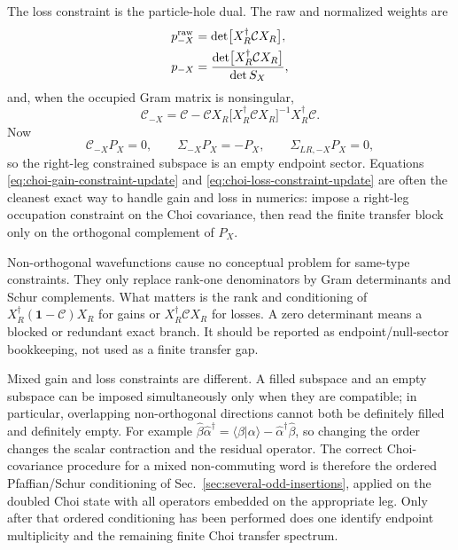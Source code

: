 \documentclass[aps,prb,onecolumn,nofootinbib,superscriptaddress]{revtex4-2}
\newcommand{\I}{\mathbf{1}}
\theoremstyle{plain}
\theoremstyle{definition}
\begin{document}
The loss constraint is the particle-hole dual.  The raw and normalized weights
are
\begin{align}
  p^{\rm raw}_{-X}
  &=
  \det\!\big[X_R^\dagger\mathcal C X_R\big],
  \label{eq:choi-loss-raw-gram}\\
  p_{-X}
  &=
  \frac{\det\!\big[X_R^\dagger\mathcal C X_R\big]}{\det S_X},
  \label{eq:choi-loss-normalized-gram}
\end{align}
and, when the occupied Gram matrix is nonsingular,
\begin{equation}
  \mathcal C_{-X}
  =
  \mathcal C
  -
  \mathcal C X_R
  \big[X_R^\dagger\mathcal C X_R\big]^{-1}
  X_R^\dagger\mathcal C .
  \label{eq:choi-loss-constraint-update}
\end{equation}
Now
\begin{equation}
  \mathcal C_{-X}P_X=0,
  \qquad
  \Sigma_{-X}P_X=-P_X,
  \qquad
  \Sigma_{LR,-X}P_X=0,
  \label{eq:choi-loss-endpoint-constraint}
\end{equation}
so the right-leg constrained subspace is an empty endpoint sector.  Equations
\eqref{eq:choi-gain-constraint-update} and
\eqref{eq:choi-loss-constraint-update} are often the cleanest exact way to
handle gain and loss in numerics: impose a right-leg occupation constraint on
the Choi covariance, then read the finite transfer block only on the
orthogonal complement of \(P_X\).

Non-orthogonal wavefunctions cause no conceptual problem for same-type
constraints.  They only replace rank-one denominators by Gram determinants and
Schur complements.  What matters is the rank and conditioning of
\(X_R^\dagger(\I-\mathcal C)X_R\) for gains or
\(X_R^\dagger\mathcal C X_R\) for losses.  A zero determinant means a blocked
or redundant exact branch.  It should be reported as endpoint/null-sector
bookkeeping, not used as a finite transfer gap.

Mixed gain and loss constraints are different.  A filled subspace and an empty
subspace can be imposed simultaneously only when they are compatible; in
particular, overlapping non-orthogonal directions cannot both be definitely
filled and definitely empty.  For example
\(\hat\beta\hat\alpha^\dagger=\langle\beta|\alpha\rangle-
\hat\alpha^\dagger\hat\beta\), so changing the order changes the scalar
contraction and the residual operator.  The correct Choi-covariance procedure
for a mixed non-commuting word is therefore the ordered Pfaffian/Schur
conditioning of Sec.~\ref{sec:several-odd-insertions}, applied on the doubled
Choi state with all operators embedded on the appropriate leg.  Only after
that ordered conditioning has been performed does one identify endpoint
multiplicity and the remaining finite Choi transfer spectrum.
\end{document}
